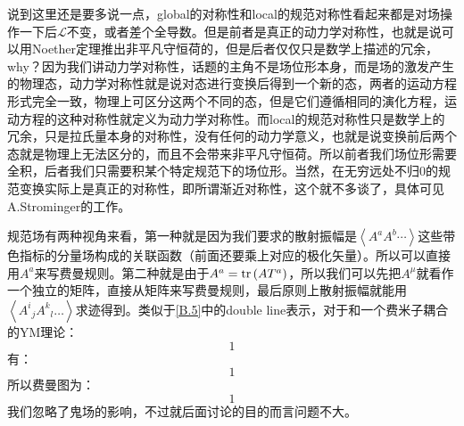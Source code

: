\begin{remark}
	说到这里还是要多说一点，global的对称性和local的规范对称性看起来都是对场操作一下后$\mathcal{L}$不变，或者差个全导数。但是前者是真正的动力学对称性，也就是说可以用Noether定理推出非平凡守恒荷的，但是后者仅仅只是数学上描述的冗余，why？因为我们讲动力学对称性，话题的主角不是场位形本身，而是场的激发产生的物理态，动力学对称性就是说对态进行变换后得到一个新的态，两者的运动方程形式完全一致，物理上可区分这两个不同的态，但是它们遵循相同的演化方程，运动方程的这种对称性就定义为动力学对称性。而local的规范对称性只是数学上的冗余，只是拉氏量本身的对称性，没有任何的动力学意义，也就是说变换前后两个态就是物理上无法区分的，而且不会带来非平凡守恒荷。所以前者我们场位形需要全积，后者我们只需要积某个特定规范下的场位形。当然，在无穷远处不归0的规范变换实际上是真正的对称性，即所谓渐近对称性，这个就不多谈了，具体可见A.Strominger的工作。
\end{remark}

规范场有两种视角来看，第一种就是因为我们要求的散射振幅是$\left<A^aA^b\cdots\right>$这些带色指标的分量场构成的关联函数（前面还要乘上对应的极化矢量）。所以可以直接用$A^a$来写费曼规则。第二种就是由于$A^a=\tr \left(A T^a\right)$，所以我们可以先把$A^\mu$就看作一个独立的矩阵，直接从矩阵来写费曼规则，最后原则上散射振幅就能用$\left<{A^{i}}_j{A^{k}}_l\ldots\right>$求迹得到。类似于\ref{B.5}中的double line表示，对于和一个费米子耦合的YM理论：
\begin{equation}
	1
\end{equation}
有：
\begin{equation}
	1
\end{equation}
所以费曼图为：
\begin{equation}
	1
\end{equation}
我们忽略了鬼场的影响，不过就后面讨论的目的而言问题不大。
